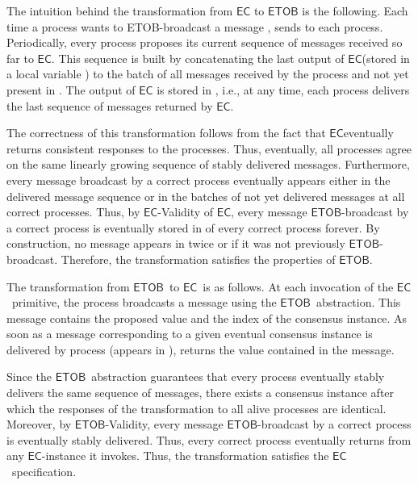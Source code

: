 \documentclass[11pt]{article}
\newcommand{\EC}{\ensuremath{\mathsf{EC}}}
\newcommand{\ETOB}{\ensuremath{\mathsf{ETOB}}}
\begin{document}
The intuition behind the transformation from {\EC} to {\ETOB} is the
following.  Each time a process  wants to ETOB-broadcast a message , 
sends  to each process.
Periodically,  every process  proposes its current
sequence of messages received so far to  \EC.
This sequence is built by concatenating the last output of  
\EC (stored in a local variable ) to the batch of all
messages received by the process and not yet present in .
The output of {\EC} is stored in , i.e.,
at any time, each process delivers the last sequence of messages
returned by {\EC}.

The correctness of this transformation follows from the fact that  \EC eventually returns consistent
responses to the processes. Thus, eventually, all processes agree on
the same linearly growing sequence of stably delivered messages.
Furthermore, every message broadcast by a
correct process eventually appears either in the delivered message sequence or
in the batches of not yet delivered messages at all correct
processes. Thus, by {\EC}-Validity of {\EC}, every message
\ETOB-broadcast by a correct process is eventually stored
in  of every correct process  forever.
By construction, no message appears in  twice or if it was not previously
\ETOB-broadcast.
Therefore, the
transformation satisfies the properties of {\ETOB}.

The transformation from \ETOB~to \EC~is as follows. At each invocation of the
\EC~primitive, the process broadcasts a message using the
\ETOB~abstraction. This message contains the proposed value and the
index of the consensus instance. As soon as a message corresponding
to a given eventual consensus instance is delivered by process  (appears in ), 
returns the value contained in the message.

Since the \ETOB~abstraction guarantees that every process eventually
stably delivers the same sequence of messages, there exists a consensus instance
after which the responses of the transformation to all alive processes
are identical.
Moreover, by \ETOB-Validity, every message \ETOB-broadcast by a
correct process  is eventually stably delivered.
Thus, every correct process eventually returns from any \EC-instance
it invokes.
Thus, the transformation satisfies the \EC~specification.
\end{document}
